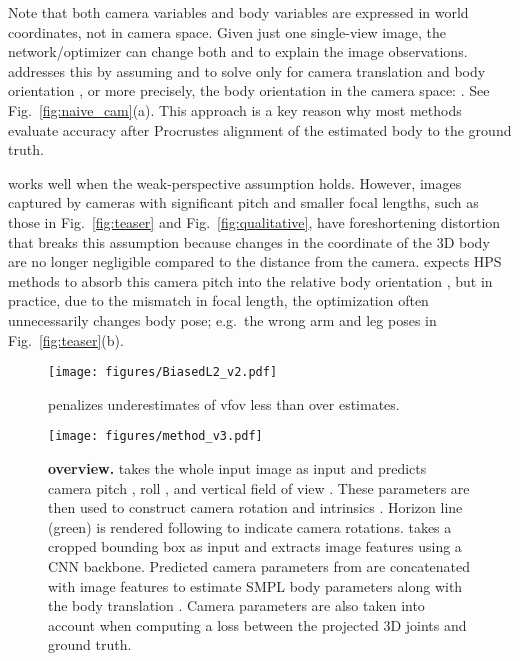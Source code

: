 \documentclass[10pt,twocolumn,letterpaper,usenames,dvipsnames]{article}
\begin{document}
Note that both camera variables  and body variables  are expressed in world coordinates, not in camera space.   
Given just one single-view image, the network/optimizer can change both  and  to explain the image observations. 
\iwcam addresses this by assuming  and  to solve only for camera translation  and body orientation , or more precisely, the body orientation in the camera space: .
See Fig.~\ref{fig:naive_cam}(a).
This approach is a key reason why most methods evaluate accuracy after Procrustes alignment of the estimated body to the ground truth.

\iwcam works well when the weak-perspective assumption holds. However, images captured by cameras with significant pitch and smaller focal lengths, such as those in Fig.~\ref{fig:teaser} and Fig.~\ref{fig:qualitative}, 
have foreshortening distortion that breaks this assumption because changes in the  coordinate of the 3D body are no longer negligible compared to the distance from the camera.  
\iwcam expects HPS methods to absorb this camera pitch  into the relative body orientation , but in practice, due to the mismatch in focal length, the optimization often unnecessarily changes body pose; e.g.~the wrong arm and leg poses in Fig.~\ref{fig:teaser}(b). 


\begin{SCfigure}
    \centering
    \texttt{[image: figures/BiasedL2\_v2.pdf]}
    \caption{\softbiasedltwo penalizes underestimates of vfov less than over estimates. }\label{fig:biased-L2}
    \vspace{-2ex}
\end{SCfigure}

\begin{figure*}[t]
    \centering
    \texttt{[image: figures/method\_v3.pdf]}
    \caption{\textbf{\methodname overview.} \camcalib takes the whole input image as input and predicts camera pitch , roll , and vertical field of view . These parameters are then used to construct camera rotation  and intrinsics . Horizon line (green) is rendered following \cite{zhu2020single} to indicate camera rotations. \methodname takes a cropped bounding box as input and extracts image features using a CNN backbone. Predicted camera parameters from \camcalib are concatenated with image features to estimate SMPL body parameters  along with the body translation . Camera parameters are also taken into account when computing a loss between the projected 3D joints  and ground truth.} 
\label{fig:model_spec}
    \vspace{-2ex}
\end{figure*}{}
\end{document}
